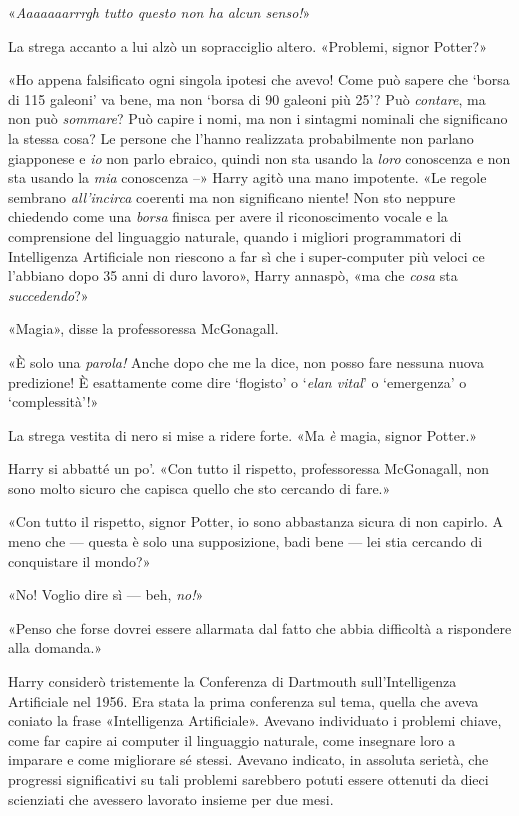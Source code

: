 «\textit{Aaaaaaarrrgh tutto questo non ha alcun senso!}»

La strega accanto a lui alzò un sopracciglio altero. «Problemi, signor Potter?»

«Ho appena falsificato ogni singola ipotesi che avevo! Come può sapere che ‘borsa di 115 galeoni’ va bene, ma non ‘borsa di 90 galeoni più 25’? Può \textit{contare}, ma non può \textit{sommare}? Può capire i nomi, ma non i sintagmi nominali che significano la stessa cosa? Le persone che l’hanno realizzata probabilmente non parlano giapponese e \textit{io} non parlo ebraico, quindi non sta usando la \textit{loro} conoscenza e non sta usando la \textit{mia} conoscenza –» Harry agitò una mano impotente. «Le regole sembrano \textit{all’incirca} coerenti ma non significano niente! Non sto neppure chiedendo come una \textit{borsa} finisca per avere il riconoscimento vocale e la comprensione del linguaggio naturale, quando i migliori programmatori di Intelligenza Artificiale non riescono a far sì che i super-computer più veloci ce l’abbiano dopo 35 anni di duro lavoro», Harry annaspò, «ma che \textit{cosa} sta \textit{succedendo}?»

«Magia», disse la professoressa McGonagall.

«È solo una \textit{parola!} Anche dopo che me la dice, non posso fare nessuna nuova predizione! È esattamente come dire ‘flogisto’ o ‘\textit{elan vital}’ o ‘emergenza’ o ‘complessità’!»

La strega vestita di nero si mise a ridere forte. «Ma \textit{è} magia, signor Potter.»

Harry si abbatté un po’. «Con tutto il rispetto, professoressa McGonagall, non sono molto sicuro che capisca quello che sto cercando di fare.»

«Con tutto il rispetto, signor Potter, io sono abbastanza sicura di non capirlo. A meno che — questa è solo una supposizione, badi bene — lei stia cercando di conquistare il mondo?»

«No! Voglio dire sì — beh, \textit{no!}»

«Penso che forse dovrei essere allarmata dal fatto che abbia difficoltà a rispondere alla domanda.»

Harry considerò tristemente la Conferenza di Dartmouth sull’Intelligenza Artificiale nel 1956. Era stata la prima conferenza sul tema, quella che aveva coniato la frase «Intelligenza Artificiale». Avevano individuato i problemi chiave, come far capire ai computer il linguaggio naturale, come insegnare loro a imparare e come migliorare sé stessi. Avevano indicato, in assoluta serietà, che progressi significativi su tali problemi sarebbero potuti essere ottenuti da dieci scienziati che avessero lavorato insieme per due mesi.

